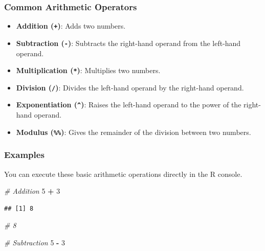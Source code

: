 \documentclass[
  b5paper]{book}
\newenvironment{Shaded}{\begin{snugshade}}{\end{snugshade}}
\newcommand{\CommentTok}[1]{\textcolor[rgb]{0.56,0.35,0.01}{\textit{#1}}}
\newcommand{\DecValTok}[1]{\textcolor[rgb]{0.00,0.00,0.81}{#1}}
\newcommand{\SpecialCharTok}[1]{\textcolor[rgb]{0.81,0.36,0.00}{\textbf{#1}}}
\providecommand{\tightlist}{%
  \setlength{\itemsep}{0pt}\setlength{\parskip}{0pt}}
\begin{document}
\hypertarget{common-arithmetic-operators}{%
\subsubsection*{Common Arithmetic Operators}\label{common-arithmetic-operators}}

\begin{itemize}
\tightlist
\item
  \textbf{Addition (\texttt{+})}: Adds two numbers.
\item
  \textbf{Subtraction (\texttt{-})}: Subtracts the right-hand operand from the left-hand operand.
\item
  \textbf{Multiplication (\texttt{*})}: Multiplies two numbers.
\item
  \textbf{Division (\texttt{/})}: Divides the left-hand operand by the right-hand operand.
\item
  \textbf{Exponentiation (\texttt{\^{}})}: Raises the left-hand operand to the power of the right-hand operand.
\item
  \textbf{Modulus (\texttt{\%\%})}: Gives the remainder of the division between two numbers.
\end{itemize}

\hypertarget{examples}{%
\subsubsection*{Examples}\label{examples}}

You can execute these basic arithmetic operations directly in the R console.

\begin{Shaded}
\begin{Highlighting}[]
\CommentTok{\# Addition}
\DecValTok{5} \SpecialCharTok{+} \DecValTok{3}
\end{Highlighting}
\end{Shaded}

\begin{verbatim}
## [1] 8
\end{verbatim}

\begin{Shaded}
\begin{Highlighting}[]
\CommentTok{\# 8}

\CommentTok{\# Subtraction}
\DecValTok{5} \SpecialCharTok{{-}} \DecValTok{3}
\end{Highlighting}
\end{Shaded}
\end{document}
